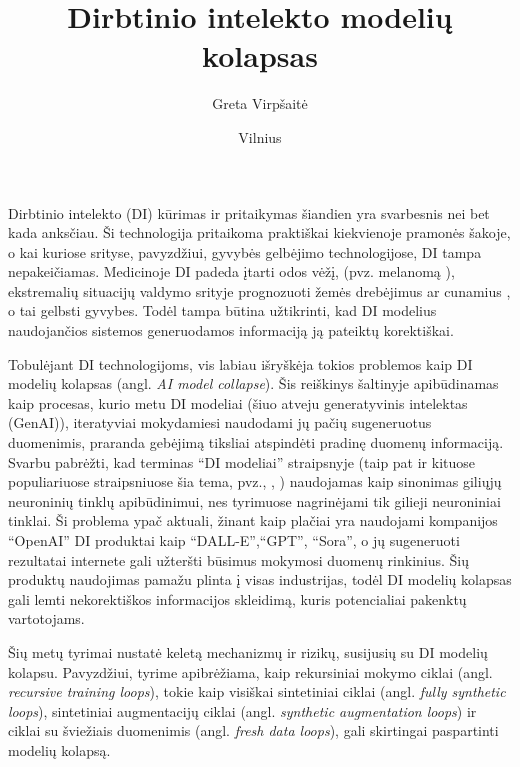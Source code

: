 \documentclass{VUMIFInfKursinis}
\title{Dirbtinio intelekto modelių kolapsas}
\author{Greta Virpšaitė}
\date{Vilnius \\ \the\year}
\begin{document}
\maketitle

\tableofcontents

Dirbtinio intelekto (DI) kūrimas ir pritaikymas šiandien yra svarbesnis nei bet kada anksčiau. Ši technologija pritaikoma praktiškai kiekvienoje pramonės šakoje, o kai kuriose srityse, pavyzdžiui, gyvybės gelbėjimo technologijose, DI tampa nepakeičiamas. Medicinoje DI padeda įtarti odos vėžį, (pvz. melanomą \cite{Melanoma}), ekstremalių situacijų valdymo srityje prognozuoti žemės drebėjimus \cite{Drebejimai} ar cunamius \cite{Cunamiai}, o tai gelbsti gyvybes. Todėl tampa būtina užtikrinti, kad DI modelius naudojančios sistemos generuodamos informaciją ją pateiktų korektiškai.

Tobulėjant DI technologijoms, vis labiau išryškėja tokios problemos kaip DI modelių kolapsas (angl. \textsl{AI model collapse}). Šis reiškinys šaltinyje \cite{AICollapseNature} apibūdinamas kaip procesas, kurio metu DI modeliai (šiuo atveju generatyvinis intelektas (GenAI)), iteratyviai mokydamiesi naudodami jų pačių sugeneruotus duomenimis, praranda gebėjimą tiksliai atspindėti pradinę duomenų informaciją. Svarbu pabrėžti, kad terminas \enquote{DI modeliai} \cite{AICollapseNature} straipsnyje (taip pat ir kituose populiariuose straipsniuose šia tema, pvz., \cite{DesniuPasiulymai}, \cite{modelCollapseRef}) naudojamas kaip sinonimas giliųjų neuroninių tinklų apibūdinimui, nes tyrimuose nagrinėjami tik gilieji neuroniniai tinklai. Ši problema ypač aktuali, žinant kaip plačiai yra naudojami kompanijos \enquote{OpenAI} DI produktai kaip \enquote{DALL-E},\enquote{GPT}, \enquote{Sora}, o jų sugeneruoti rezultatai internete gali užteršti būsimus mokymosi duomenų rinkinius. Šių produktų naudojimas pamažu plinta į visas industrijas, todėl DI modelių kolapsas gali lemti nekorektiškos informacijos skleidimą, kuris potencialiai pakenktų vartotojams.  

Šių metų tyrimai nustatė keletą mechanizmų ir rizikų, susijusių su DI modelių kolapsu. Pavyzdžiui, tyrime 
\cite{ModelsGoMAD} apibrėžiama, kaip rekursiniai mokymo ciklai (angl. \textsl{recursive training loops}), tokie kaip visiškai sintetiniai ciklai (angl. \textsl{fully synthetic loops}), sintetiniai augmentacijų ciklai (angl. \textsl{synthetic augmentation loops}) ir ciklai su šviežiais duomenimis (angl. \textsl{fresh data loops}), gali skirtingai paspartinti modelių kolapsą. 
\end{document}
